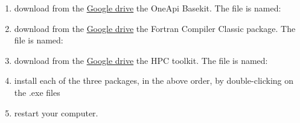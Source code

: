 \begin{enumerate}
\item download from the \hyperlink{Google}{Google drive} the OneApi Basekit. The file is named:\\
\hspace{5ex}{\tt w\_BaseKit\_p\_2023.1.0.47256\_offline.exe}
\item download from the \hyperlink{Google}{Google drive} the Fortran Compiler Classic package. The file is named:\\
\hspace{5ex}{\tt w\_ifort\_runtime\_p\_2023.1.0.46319.exe}
\item download from the \hyperlink{Google}{Google drive} the HPC toolkit. The file is named:\\
\hspace{5ex}{\tt w\_HPCKit\_p\_2023.1.0.46357\_offline.exe}
\item install each of the three packages, in the above order, by double-clicking on the .exe files
\item restart your computer.
\end{enumerate}




